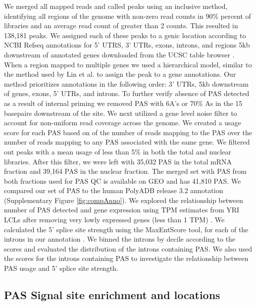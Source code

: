 We merged all mapped reads and called peaks using an inclusive method, identifying all regions of the genome with non-zero read counts in 90\% percent of libraries and an average read count of greater than 2 counts. This resulted in 138,181 peaks. We assigned each of these peaks to a genic location according to NCBI Refseq annotations for 5' UTRS, 3' UTRs, exons, introns, and regions 5kb downstream of annotated genes downloaded from the UCSC table browser \citep{kent_human_2002}. When a region mapped to multiple genes we used a hierarchical model, similar to the method used by Lin et al. \citep{lin_-depth_2012} to assign the peak to a gene annotations. Our method prioritizes annotations in the following order: 3' UTRs, 5kb downstream of genes, exons, 5'  UTRs, and introns. To further verify absence of PAS detected as a result of internal priming we removed PAS with 6A's or 70\% As in the 15 basepairs downstream of the site. We next utilized a gene level noise filter to account for non-uniform read coverage across the genome. We created a usage score for each PAS based on of the number of reads mapping to the PAS over the number of reads mapping to any PAS associated with the same gene. We filtered out peaks with a mean usage of less than 5\% in both the total and nuclear libraries. After this filter, we were left with 35,032 PAS in the total mRNA fraction and 39,164 PAS in the nuclear fraction. The merged set with PAS from both fractions used for PAS QC is available on GEO and has 41,810 PAS. We compared our set of PAS to the human PolyADB release 3.2 annotation \citep{wang_polya_db_2018}(Supplementary Figure  \ref{fig:compAnno}). We explored the relationship between number of PAS detected and gene expression using TPM estimates from YRI LCLs after removing very lowly expressed genes (less than 1 TPM) \citep{lappalainen_transcriptome_2013}. We calculated the 5' splice site strength using the MaxEntScore tool, for each of the introns in our annotation \citep{yeo_maximum_2004}. We binned the introns by decile according to the scores and evaluated the distribution of the introns containing PAS. We also used the scores for the introns containing PAS to investigate the relationship between PAS usage and 5' splice site strength.

\subsection{PAS Signal site enrichment and locations}\label{PAS-Signal-site-enrichment-and-locations}

